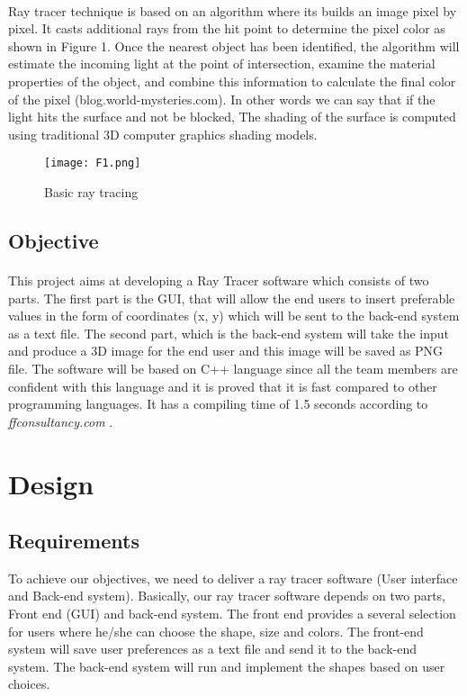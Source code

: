 \documentclass{article}
\begin{document}
\paragraph{}
Ray tracer technique is based on an algorithm where its builds an image pixel by pixel. It casts additional rays from the hit point to determine the pixel color as shown in Figure 1.
Once the nearest object has been identified, the algorithm will estimate the incoming light at the point of intersection, examine the material properties of the object, and combine this information to calculate the final color of the pixel (blog.world-mysteries.com). In other words we can say that if the light hits the surface and not be blocked,  The shading of the surface is computed using traditional 3D computer graphics shading models. 

\begin{figure}
    \centering
    \texttt{[image: F1.png]}
    \caption{Basic ray tracing}
    \label{figure1}
\end{figure}

\subsection{Objective}

\paragraph{}
This project aims at developing a Ray Tracer software which consists of two parts. The first part is the GUI, that will allow the end users to insert preferable values in the form of coordinates (x, y) which will be sent to the back-end system as a text file.
The second part, which is the back-end system will take the input and produce  a 3D image for the end user and this image will be saved as PNG file. 
The software will be based on C++ language since all the team members are confident with this language and it is proved that it is fast compared to other programming languages. It has a compiling time of 1.5 seconds according to \textit{ffconsultancy.com }.


\section{Design}

\subsection{Requirements}
To achieve our objectives, we need to deliver a ray tracer software (User interface and Back-end system). 
Basically, our ray tracer software depends on two parts, Front end (GUI) and back-end system. The front end provides a several selection for users where he/she can choose the shape, size and colors. The front-end system will save user preferences as a text file and send it to the back-end system. 
The back-end system will run and implement the shapes based on user choices.
\end{document}
